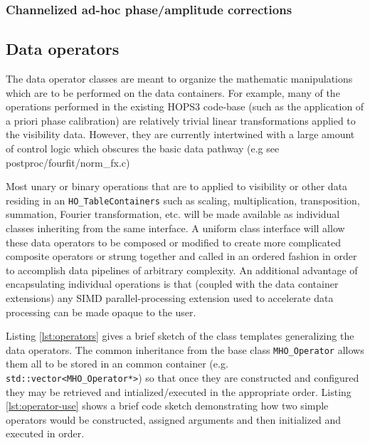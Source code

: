 \newpage 

\subsubsection{Channelized ad-hoc phase/amplitude corrections}


\subsection{Data operators}

The data operator classes are meant to organize the mathematic manipulations which are to be performed on the data containers. For example, many of the operations performed in the existing HOPS3 code-base (such as the application of a priori phase calibration) are relatively trivial linear transformations applied to the visibility data. However, they are currently intertwined with a large amount of control logic which obscures the basic data pathway (e.g see postproc/fourfit/norm\_fx.c)

Most unary or binary operations that are to applied to visibility or other data residing in an \texttt{HO\_TableContainers} such as scaling, multiplication, transposition, summation, Fourier transformation, etc. will be made available as individual classes inheriting from the same interface. A uniform class interface will allow these data operators to be composed or modified to create more complicated composite operators or strung together and called in an ordered fashion in order to accomplish data pipelines of arbitrary complexity. An additional advantage of encapsulating individual operations is that (coupled with the data container extensions) any SIMD parallel-processing extension used to accelerate data processing can be made opaque to the user.

Listing \ref{lst:operators} gives a brief sketch of the class templates generalizing the data operators. The common inheritance from the base class \texttt{MHO\_Operator} allows them all to be stored in an common container (e.g. \texttt{std::vector<MHO\_Operator*>}) so that once they are
constructed and configured they may be retrieved and intialized/executed in the appropriate order. Listing \ref{lst:operator-use} shows a brief code
sketch demonstrating how two simple operators would be constructed, assigned arguments and then initialized and executed in order.



